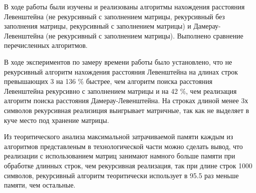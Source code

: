 \Conclusion
    В ходе работы были изучены и реализованы алгоритмы нахождения
    расстояния Левенштейна (не рекурсивный с заполнением матрицы,
    рекурсивный без заполнения матрицы, рекурсивный с заполнением матрицы)
    и Дамерау-Левенштейна (не рекурсивный с заполнением матрицы). 
    Выполнено сравнение перечисленных алгоритмов. 
    
    В ходе экспериментов по замеру времени работы было установлено, что не рекурсивный алгоритм нахождения расстояния Левенштейна
    на длинах строк превышающих 3 на 136 \% быстрее, чем алгоритм поиска
    расстояния Левенштейна рекурсивно с заполнением матрицы и на 42 \%,
    чем реализация алгоритм поиска расстояния Дамерау-Левенштейна. На строках
    длиной менее 3х символов рекурсивная реализиция выигрывает матричные, так
    как не выделяет в куче место под хранение матрицы.
    
    Из теоритического анализа максимальной затрачиваемой памяти каждым из алгоритмов 
    представленым в технологической части можно сделать вывод, что реализации
    с использованием матриц занимают намного больше памяти при обработке
    длинных строк, чем рекурсивная реализация, так при длине строк 1000
    символов, рекурсивный алгоритм теоритически использует в 95.5 раз меньше памяти, чем остальные.
